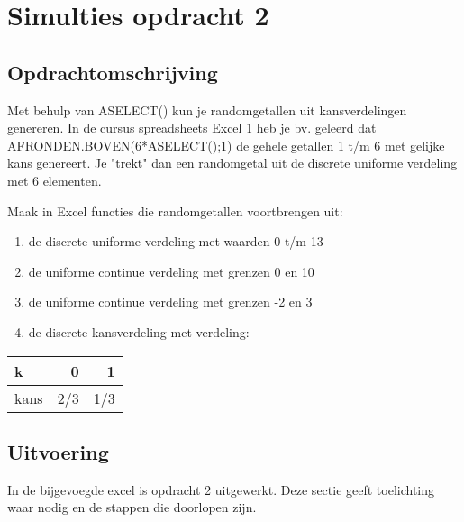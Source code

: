 \documentclass{article}
\begin{document}



\section{Simulties opdracht 2}
\label{sec:sample_main}

\subsection{Opdrachtomschrijving}
\label{subsec:sample_opdrom}

Met behulp van ASELECT() kun je randomgetallen uit kansverdelingen genereren. In de cursus spreadsheets Excel 1 heb je bv. geleerd dat AFRONDEN.BOVEN(6*ASELECT();1) de gehele getallen 1 t/m 6 met gelijke kans genereert. Je "trekt" dan een randomgetal uit de discrete uniforme verdeling met 6 elementen.

Maak in Excel functies die randomgetallen voortbrengen uit:
\begin{enumerate}[label=(\Alph*)]
\item de discrete uniforme verdeling met waarden 0 t/m 13  
\item de uniforme continue verdeling met grenzen 0 en 10
\item de uniforme continue verdeling met grenzen -2 en 3
\item de discrete kansverdeling met verdeling:
\end{enumerate}

\begin{table}[h]
  \begin{tabular}{|l|r|r|}
      \hline
      k & 0 & 1 \\ \hline
      kans & 2/3 & 1/3 \\ 
      \hline
  \end{tabular}
\end{table}

\newpage
\subsection{Uitvoering}
\label{subsec:sample_uitv}

In de bijgevoegde excel is opdracht 2 uitgewerkt. Deze sectie geeft toelichting waar nodig en de stappen die doorlopen zijn.
\end{document}

